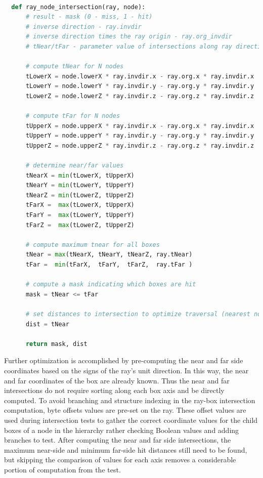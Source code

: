 \begin{lstlisting}[language=Python,basicstyle=\tiny,caption={A non-branching ray-node intersection test for a quad tree implementation.},
    label={alg:no-branch ray-box pseudo code},captionpos=b]

  def ray_node_intersection(ray, node):
      # result - mask (0 - miss, 1 - hit)
      # inverse direction - ray.invdir
      # inverse direction times the ray origin - ray.org_invdir
      # tNear/tFar - parameter value of intersections along ray direction
  
      # compute tNear for N nodes
      tLowerX = node.lowerX * ray.invdir.x - ray.org.x * ray.invdir.x
      tLowerY = node.lowerY * ray.invdir.y - ray.org.y * ray.invdir.y
      tLowerZ = node.lowerZ * ray.invdir.z - ray.org.z * ray.invdir.z

      # compute tFar for N nodes
      tUpperX = node.upperX * ray.invdir.x - ray.org.x * ray.invdir.x
      tUpperY = node.upperY * ray.invdir.y - ray.org.y * ray.invdir.y
      tUpperZ = node.upperZ * ray.invdir.z - ray.org.z * ray.invdir.z

      # determine near/far values
      tNearX = min(tLowerX, tUpperX)
      tNearY = min(tLowerY, tUpperY)
      tNearZ = min(tLowerZ, tUpperZ)
      tFarX =  max(tLowerX, tUpperX)
      tFarY =  max(tLowerY, tUpperY)
      tFarZ =  max(tLowerZ, tUpperZ)
      
      # compute maximum tnear for all boxes
      tNear = max(tNearX, tNearY, tNearZ, ray.tNear) 
      tFar =  min(tFarX,  tFarY,  tFarZ,  ray.tFar )

      # compute a mask indicating which boxes are hit
      mask = tNear <= tFar

      # set distances to intersection to optimize traversal (nearest nodes first)
      dist = tNear

      return mask, dist
\end{lstlisting}

Further optimization is accomplished by pre-computing the near and far side
coordinates based on the signs of the ray's unit direction. In this way, the
near and far coordinates of the box are already known. Thus the near and far
intersections do not require sorting along each box axis and be directly
computed. To avoid branching and structure indexing in the ray-box intersection
computation, byte offsets values are pre-set on the ray. These offset values are
used during intersection tests to gather the correct coordinate values for the
child boxes of a node in the hierarchy rather checking Boolean values and adding
branches to test. After computing the near and far side intersections, the
maximum near-side and minimum far-side hit distances still need to be found, but
skipping the comparison of values for each axis removes a considerable portion
of computation from the test.

